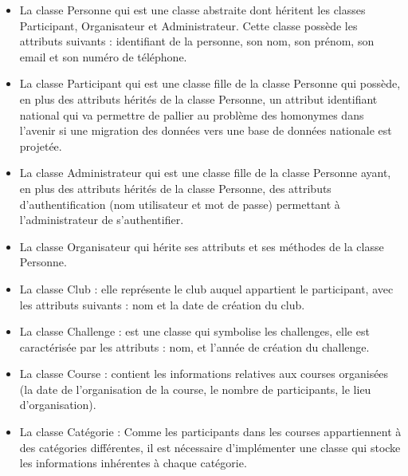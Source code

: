 \begin{itemize} 
 	\item La classe Personne qui est une classe abstraite dont héritent les classes Participant, Organisateur et Administrateur. Cette classe possède les attributs suivants : identifiant de la personne, son nom, son prénom, son email et son numéro de téléphone.
 	\item La classe Participant qui est une classe fille de la classe Personne qui possède, en plus des attributs hérités de la classe Personne, un attribut identifiant national qui va permettre de pallier au problème des homonymes dans l’avenir si une migration des données vers une base de données nationale est projetée.
 	\item La classe Administrateur qui est une classe fille de la classe Personne ayant, en plus des attributs hérités de la classe Personne, des attributs d’authentification (nom utilisateur et mot de passe) permettant à l’administrateur de s’authentifier. 
 	\item La classe Organisateur qui hérite ses attributs et ses méthodes de la classe Personne.
 	\item La classe Club : elle représente le club auquel appartient le participant, avec les attributs suivants : nom et la date de création du club.
 	\item La classe Challenge : est une classe qui symbolise les challenges, elle est caractérisée par les attributs : nom, et l’année de création du challenge.
 	\item La classe Course : contient les informations relatives aux courses organisées (la date de l’organisation de la course, le nombre de participants, le lieu d’organisation).
 	\item La classe Catégorie : Comme les participants dans les courses appartiennent à des catégories différentes, il est nécessaire d’implémenter une classe qui stocke les informations inhérentes à chaque catégorie. 
\end{itemize} 
